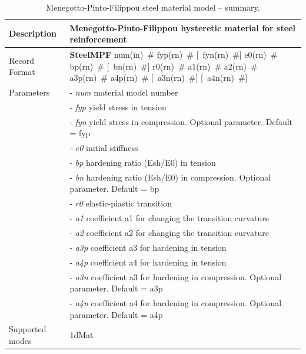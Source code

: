 \documentclass[a4paper]{article}
\newcommand{\descitem}[1]{{\noindent \bf #1}}
\newcommand{\elemparam}[2]{{{#1\tiny (#2)}~\#}}
\newcommand{\optelemparam}[2]{[{~\elemparam{#1}{#2}}]}
\newcommand{\param}[1]{{\it #1}}
\newenvironment{mmt}{\begin{tabular}{|l|p{9cm}|}}{\end{tabular}\\}
\newenvironment{mmt}{\begin{tabular}{|l|l|}}{\end{tabular}\\}
\begin{document}
\begin{table}[!htb]
	\begin{mmt}
		\hline
		Description & Menegotto-Pinto-Filippou hysteretic material for steel reinforcement\\
		\hline
		Record Format & \descitem{SteelMPF}
		\elemparam{num}{in}
		\elemparam{fyp}{rn}
		\optelemparam{fyn}{rn}
		\elemparam{e0} {rn}
		\elemparam{bp} {rn}
		\optelemparam{bn} {rn}
		\elemparam{r0} {rn}
		\elemparam{a1} {rn}
		\elemparam{a2} {rn}
		\elemparam{a3p}{rn}
		\elemparam{a4p}{rn}
		\optelemparam{a3n}{rn}
		\optelemparam{a4n}{rn}\\
		Parameters &- \param{num} material model number\\
		&- \param{fyp} yield stress in tension \\
		&- \param{fyn} yield stress in compression. Optional parameter. Default = fyp \\
		&- \param{e0}  initial stiffness  \\
		&- \param{bp}  hardening ratio (Esh/E0) in tension \\
		&- \param{bn}  hardening ratio (Esh/E0) in compression. Optional parameter. Default = bp \\
		&- \param{r0}  elastic-plastic transition \\
		&- \param{a1}  coefficient a1 for changing the transition curvature \\
		&- \param{a2}  coefficient a2 for changing the transition curvature \\
		&- \param{a3p} coefficient a3 for hardening in tension \\
		&- \param{a4p} coefficient a4 for hardening in tension \\
		&- \param{a3n} coefficient a3 for hardening in compression. Optional parameter. Default = a3p \\
		&- \param{a4n} coefficient a4 for hardening in compression. Optional parameter. Default = a4p \\
		
		Supported modes& 1dMat\\
		\hline
	\end{mmt}
	\caption{Menegotto-Pinto-Filippou steel material model -- summary.}
	\label{steelmpf_table}
\end{table}
\end{document}
